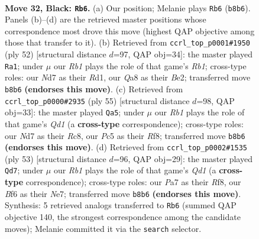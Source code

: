 \documentclass[11pt]{article}
\begin{document}
\clearpage

\begin{figure}[p]\centering
\begin{subfigure}{0.46\textwidth}\centering
\resizebox{\linewidth}{!}{%
\newchessgame
\chessboard[
  setfen={qrb3k1/p2n1r1p/5b2/2p5/Pp1p1P2/1P1Q2N1/R3P3/1NBK3R b - - 11 32},
  showmover=false,
  pgfstyle=straightmove, color=movearrow, markmove={b8-b6}
]}
\caption{}
\end{subfigure}\hfill
\begin{subfigure}{0.46\textwidth}\centering
\resizebox{\linewidth}{!}{%
\newchessgame
\chessboard[
  setfen={rr4k1/5pp1/5q1p/1P1pn3/n1pN4/4P3/2Q1BPPP/1R1R2K1 w - - 4 27},
  showmover=false,
  pgfstyle=straightmove, color=movearrow, markmove={b1-a1}
]}
\caption{}
\end{subfigure}
\\[4pt]
\begin{subfigure}{0.46\textwidth}\centering
\resizebox{\linewidth}{!}{%
\newchessgame
\chessboard[
  setfen={2rq1rk1/1p2bp2/3p2p1/3Pn3/3N1R1P/pP4Q1/P3B1P1/R6K b - - 0 28},
  showmover=false,
  pgfstyle=straightmove, color=movearrow, markmove={d8-a5}
]}
\caption{}
\end{subfigure}\hfill
\begin{subfigure}{0.46\textwidth}\centering
\resizebox{\linewidth}{!}{%
\newchessgame
\chessboard[
  setfen={3q1rk1/4npb1/2r3b1/3p2p1/2pP2P1/P3P1N1/5PBN/R1RQ2K1 b - - 4 27},
  showmover=false,
  pgfstyle=straightmove, color=movearrow, markmove={d8-d7}
]}
\caption{}
\end{subfigure}
\caption{\textbf{Move 32, Black: \texttt{Rb6}.} (a) Our position; Melanie plays \texttt{Rb6} (\texttt{b8b6}). Panels (b)--(d) are the retrieved master positions whose correspondence most drove this move (highest QAP objective among those that transfer to it). (b) Retrieved from \texttt{ccrl\_top\_p0001\#1950} (ply 52) [structural distance $d$=97, QAP obj=34]: the master played \texttt{Ra1}; under $\mu$ our \emph{Rb1} plays the role of that game's \emph{Rb1}; cross-type roles: our \emph{N}d7 as their \emph{R}d1, our \emph{Q}a8 as their \emph{B}e2; transferred move \texttt{b8b6} \textbf{(endorses this move)}. (c) Retrieved from \texttt{ccrl\_top\_p0000\#2935} (ply 55) [structural distance $d$=98, QAP obj=33]: the master played \texttt{Qa5}; under $\mu$ our \emph{Rb1} plays the role of that game's \emph{Qd1} (a \textbf{cross-type} correspondence); cross-type roles: our \emph{N}d7 as their \emph{R}c8, our \emph{P}c5 as their \emph{R}f8; transferred move \texttt{b8b6} \textbf{(endorses this move)}. (d) Retrieved from \texttt{ccrl\_top\_p0002\#1535} (ply 53) [structural distance $d$=96, QAP obj=29]: the master played \texttt{Qd7}; under $\mu$ our \emph{Rb1} plays the role of that game's \emph{Qd1} (a \textbf{cross-type} correspondence); cross-type roles: our \emph{P}a7 as their \emph{R}f8, our \emph{B}f6 as their \emph{N}e7; transferred move \texttt{b8b6} \textbf{(endorses this move)}. Synthesis: 5 retrieved analogs transferred to \texttt{Rb6} (summed QAP objective 140, the strongest correspondence among the candidate moves); Melanie committed it via the \texttt{search} selector.}
\label{fig:thought-m63}
\end{figure}
\end{document}
